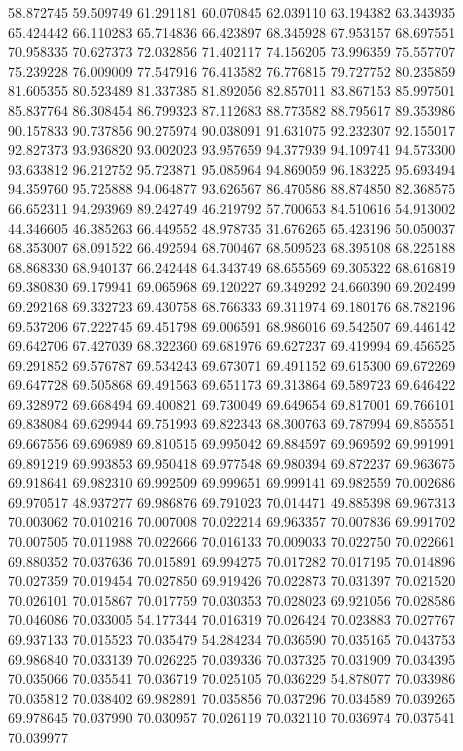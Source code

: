 58.872745
59.509749
61.291181
60.070845
62.039110
63.194382
63.343935
65.424442
66.110283
65.714836
66.423897
68.345928
67.953157
68.697551
70.958335
70.627373
72.032856
71.402117
74.156205
73.996359
75.557707
75.239228
76.009009
77.547916
76.413582
76.776815
79.727752
80.235859
81.605355
80.523489
81.337385
81.892056
82.857011
83.867153
85.997501
85.837764
86.308454
86.799323
87.112683
88.773582
88.795617
89.353986
90.157833
90.737856
90.275974
90.038091
91.631075
92.232307
92.155017
92.827373
93.936820
93.002023
93.957659
94.377939
94.109741
94.573300
93.633812
96.212752
95.723871
95.085964
94.869059
96.183225
95.693494
94.359760
95.725888
94.064877
93.626567
86.470586
88.874850
82.368575
66.652311
94.293969
89.242749
46.219792
57.700653
84.510616
54.913002
44.346605
46.385263
66.449552
48.978735
31.676265
65.423196
50.050037
68.353007
68.091522
66.492594
68.700467
68.509523
68.395108
68.225188
68.868330
68.940137
66.242448
64.343749
68.655569
69.305322
68.616819
69.380830
69.179941
69.065968
69.120227
69.349292
24.660390
69.202499
69.292168
69.332723
69.430758
68.766333
69.311974
69.180176
68.782196
69.537206
67.222745
69.451798
69.006591
68.986016
69.542507
69.446142
69.642706
67.427039
68.322360
69.681976
69.627237
69.419994
69.456525
69.291852
69.576787
69.534243
69.673071
69.491152
69.615300
69.672269
69.647728
69.505868
69.491563
69.651173
69.313864
69.589723
69.646422
69.328972
69.668494
69.400821
69.730049
69.649654
69.817001
69.766101
69.838084
69.629944
69.751993
69.822343
68.300763
69.787994
69.855551
69.667556
69.696989
69.810515
69.995042
69.884597
69.969592
69.991991
69.891219
69.993853
69.950418
69.977548
69.980394
69.872237
69.963675
69.918641
69.982310
69.992509
69.999651
69.999141
69.982559
70.002686
69.970517
48.937277
69.986876
69.791023
70.014471
49.885398
69.967313
70.003062
70.010216
70.007008
70.022214
69.963357
70.007836
69.991702
70.007505
70.011988
70.022666
70.016133
70.009033
70.022750
70.022661
69.880352
70.037636
70.015891
69.994275
70.017282
70.017195
70.014896
70.027359
70.019454
70.027850
69.919426
70.022873
70.031397
70.021520
70.026101
70.015867
70.017759
70.030353
70.028023
69.921056
70.028586
70.046086
70.033005
54.177344
70.016319
70.026424
70.023883
70.027767
69.937133
70.015523
70.035479
54.284234
70.036590
70.035165
70.043753
69.986840
70.033139
70.026225
70.039336
70.037325
70.031909
70.034395
70.035066
70.035541
70.036719
70.025105
70.036229
54.878077
70.033986
70.035812
70.038402
69.982891
70.035856
70.037296
70.034589
70.039265
69.978645
70.037990
70.030957
70.026119
70.032110
70.036974
70.037541
70.039977
